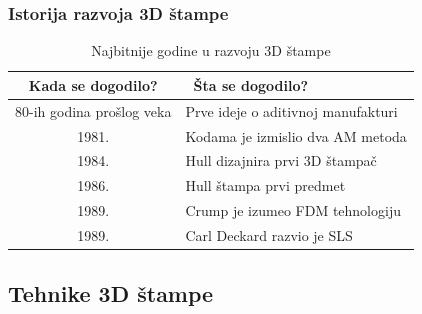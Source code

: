 \documentclass{beamer}
\begin{document}
\begin{frame}[fragile]\frametitle{Istorija razvoja 3D štampe}

\begin{table}[h!]
\begin{center}
\caption{Najbitnije godine u razvoju 3D štampe}
\begin{tabular}{|c|l|} \hline
\textbf{Kada se dogodilo?}& \textbf{\ Šta se dogodilo?}\\ \hline
80-ih godina prošlog veka &Prve ideje o aditivnoj manufakturi\\ \hline
1981. &Kodama je izmislio dva AM metoda\\ \hline
1984. &Hull dizajnira prvi 3D štampač\\ \hline
1986. &Hull štampa prvi predmet\\ \hline
1989. &Crump je izumeo FDM tehnologiju\\ \hline
1989. &Carl Deckard razvio je SLS\\ \hline
\end{tabular}
\label{tab:tabela1}
\end{center}
\end{table}
\end{frame}


\subsection{Tehnike 3D štampe}
\end{document}

